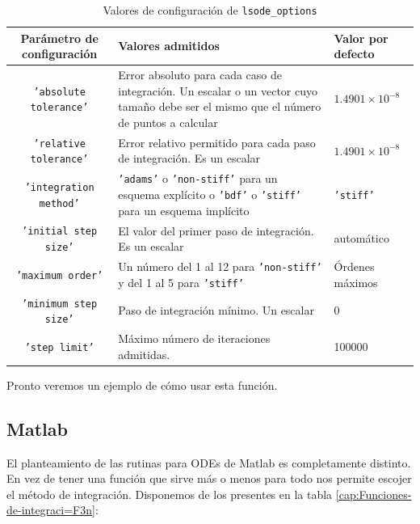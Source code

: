 %
\begin{table}[H]
  \centering{}\begin{tabular}{|c|m{8cm}|p{3cm}|}
    \hline 
    Parámetro de configuración&
    Valores admitidos&
    Valor por defecto\tabularnewline
    \hline
    \hline 
    \texttt{'absolute tolerance'}&
    Error absoluto para cada caso de integración. Un escalar o un vector
    cuyo tamaño debe ser el mismo que el número de puntos a calcular&
    $1.4901\times10^{-8}$\tabularnewline
    \hline 
    \texttt{'relative tolerance'}&
    Error relativo permitido para cada paso de integración. Es un escalar&
    $1.4901\times10^{-8}$\tabularnewline
    \hline 
    \texttt{'integration method'}&
    \texttt{'adams'} o \texttt{'non-stiff'} para un esquema explícito
    o \texttt{'bdf'} o \texttt{'stiff'} para un esquema implícito&
    \texttt{'stiff'}\tabularnewline
    \hline 
    \texttt{'initial step size'}&
    El valor del primer paso de integración. Es un escalar&
    automático\tabularnewline
    \hline 
    \texttt{'maximum order'}&
    Un número del 1 al 12 para \texttt{'non-stiff'} y del 1 al 5 para
    \texttt{'stiff'}&
    Órdenes máximos\tabularnewline
    \hline 
    \texttt{'minimum step size'}&
    Paso de integración mínimo. Un escalar&
    0\tabularnewline
    \hline 
    \texttt{'step limit'}&
    Máximo número de iteraciones admitidas.&
    100000\tabularnewline
    \hline
  \end{tabular}


  \caption{Valores de configuración de \texttt{lsode\_options}}
\end{table}


Pronto veremos un ejemplo de cómo usar esta función.


\subsection{Matlab}

El planteamiento de las rutinas para ODEs de Matlab es completamente
distinto. En vez de tener una función que sirve más o menos para todo
nos permite escojer el método de integración. Disponemos de los presentes
en la tabla \ref{cap:Funciones-de-integraci=F3n}:

